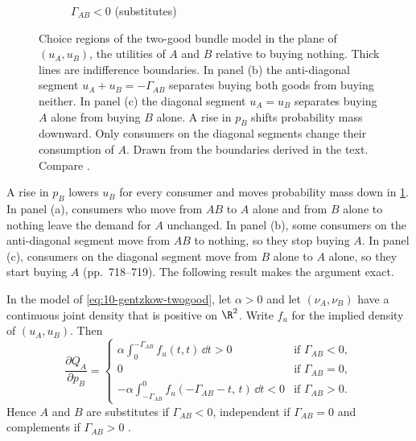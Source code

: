 \begin{figure}[htbp]
\begin{subfigure}[b]{0.32\textwidth}
\caption{$\Gamma_{AB} < 0$ (substitutes)}
\end{subfigure}
\caption{Choice regions of the two-good bundle model in the plane of $(u_A, u_B)$, the utilities of $A$ and $B$ relative
to buying nothing. Thick lines are indifference boundaries. In panel (b) the anti-diagonal segment $u_A + u_B =
-\Gamma_{AB}$ separates buying both goods from buying neither. In panel (c) the diagonal segment $u_A = u_B$ separates
buying $A$ alone from buying $B$ alone. A rise in $p_B$ shifts probability mass downward. Only consumers on the
diagonal segments change their consumption of $A$. Drawn from the boundaries derived in the text. Compare
\citet[Figure~1]{Gentzkow2007}.}
\label{fig:10-gentzkow-regions}
\end{figure}

 A rise in $p_B$ lowers $u_B$ for every consumer and moves probability
mass down in \cref{fig:10-gentzkow-regions}. In panel (a), consumers who move from $AB$ to $A$ alone and from $B$
alone to nothing leave the demand for $A$ unchanged. In panel (b), some consumers on the anti-diagonal segment move
from $AB$ to nothing, so they stop buying $A$. In panel (c), consumers on the diagonal segment move from $B$ alone to
$A$ alone, so they start buying $A$ (pp.~718--719). The following result makes the argument exact.

\begin{proposition}\label{prop:10-gentzkow-subst}
In the model of \eqref{eq:10-gentzkow-twogood}, let $\alpha > 0$ and let $(\nu_A,\nu_B)$ have a continuous joint density that
is positive on $\R^2$. Write $f_u$ for the implied density of $(u_A, u_B)$. Then
\begin{equation}\label{eq:10-gentzkow-crossderiv}
  \frac{\partial Q_A}{\partial p_B} =
  \begin{cases}
    \alpha\displaystyle\int_0^{-\Gamma_{AB}} f_u(t,t)\,\dd t > 0 & \text{if } \Gamma_{AB} < 0,\\[2ex]
    0 & \text{if } \Gamma_{AB} = 0,\\[1ex]
    -\alpha\displaystyle\int_{-\Gamma_{AB}}^{0} f_u(-\Gamma_{AB} - t,\, t)\,\dd t < 0 & \text{if } \Gamma_{AB} > 0 .
  \end{cases}
\end{equation}
Hence $A$ and $B$ are substitutes if $\Gamma_{AB} < 0$, independent if $\Gamma_{AB} = 0$ and complements if
$\Gamma_{AB} > 0$ \citep[Proposition~1]{Gentzkow2007}.
\end{proposition}

